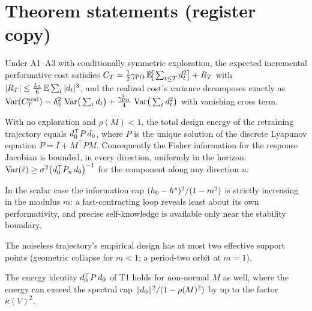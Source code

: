 \documentclass[11pt]{article}
\begin{document}
\section*{Theorem statements (register copy)}


\begin{lemma}
Under A1--A3 with conditionally symmetric exploration, the expected
incremental performative cost satisfies
$C_T = \tfrac{1}{2}\gamma_{\mathrm{PO}}\,\mathbb{E}\!\big[\sum_{t\le T}d_t^2\big] + R_T$ with
$|R_T| \le \tfrac{L_3}{6}\,\mathbb{E}\sum_t |d_t|^3$, and the realized cost's
variance decomposes exactly as
$\operatorname{Var}(C_T^{\mathrm{real}}) = \delta_0^2\,\operatorname{Var}\!\big(\sum_t d_t\big)
+ \tfrac{\gamma_{\mathrm{PO}}^2}{4}\,\operatorname{Var}\!\big(\sum_t d_t^2\big)$
with vanishing cross term.
\end{lemma}

\begin{theorem}
With no exploration and $\rho(M)<1$, the total design energy of the
retraining trajectory equals $d_0^\top P\,d_0$, where $P$ is the
unique solution of the discrete Lyapunov equation $P = I + M^\top P M$.
Consequently the Fisher information for the response Jacobian is bounded,
in every direction, uniformly in the horizon:
$\operatorname{Var}(\hat{\varepsilon}) \ge \sigma^2\big(d_0^\top P_u\,d_0\big)^{-1}$ for the
component along any direction $u$.
\end{theorem}

\begin{corollary}
In the scalar case the information cap $(h_0-h^{*})^2/(1-m^2)$ is strictly
increasing in the modulus $m$: a fast-contracting loop reveals least about
its own performativity, and precise self-knowledge is available only near
the stability boundary.
\end{corollary}

\begin{corollary}
The noiseless trajectory's empirical design has at most two effective
support points (geometric collapse for $m<1$; a period-two orbit at
$m=1$).
\end{corollary}

\begin{remark}
The energy identity $d_0^\top P\,d_0$ of T1 holds for non-normal $M$
as well, where the energy can exceed the spectral cap
$\|d_0\|^2/(1-\rho(M)^2)$ by up to the factor $\kappa(V)^2$.
\end{remark}
\end{document}
